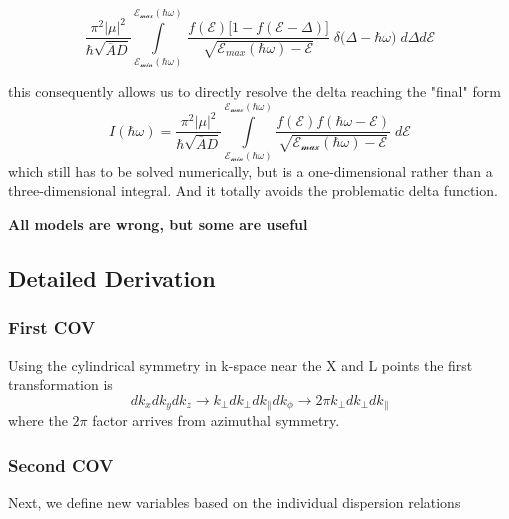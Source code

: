 \begin{equation}
\frac{\pi^{2}|\mu|^{2}}{\hbar \sqrt{ \overline{A}D }}\int\limits_{\mathcal{E_{min}(\hbar \omega)}}^{\mathcal{E_{max}(\hbar \omega)}}  \, \frac{f(\mathcal{E})\Big[ 1-f(\mathcal{E}-\Delta) \Big]}{\sqrt{ \mathcal{E}_{max}(\hbar\omega) -\mathcal{E}}} \; \delta \big( \Delta - \hbar\omega \big) \; d\Delta d\mathcal{E}
\label{eq:quadratic_interband_reduced_integral}
\end{equation}

this consequently allows us to directly resolve the delta reaching the "final" form
\begin{equation}
I(\hbar\omega)= \frac{\pi^{2}|\mu|^{2}}{\hbar \sqrt{ \overline{A}D }}
\int\limits_{\mathcal{E_{min}(\hbar \omega)}}^{\mathcal{E_{max}(\hbar \omega)}} \frac{{f(\mathcal{E})f(\hbar\omega-\mathcal{E})}}{\sqrt{ \mathcal{E_{max}(\hbar\omega)}-\mathcal{E} }} \; d\mathcal{E}
\label{eq:quadratic_interband_final_form}
\end{equation}
which still has to be solved numerically, but is a one-dimensional rather than a three-dimensional integral. And it totally avoids the problematic delta function.

\textbf{All models are wrong, but some are useful}
\newpage
\subsection{Detailed Derivation}

\subsubsection{First COV}
Using the cylindrical symmetry in k-space near the X and L points the first transformation is
\begin{equation}
dk_{x}dk_{y} dk_{z}\to k_{\perp}dk_{\perp}dk_{\parallel}dk_{\phi}\to 2\pi k_{\perp} dk_{\perp} dk_{\parallel}
\label{eq:quadratic_interband_cov1}
\end{equation}
where the $2\pi$ factor arrives from azimuthal symmetry. 

\subsubsection{Second COV}
Next, we define new variables based on the individual dispersion relations

